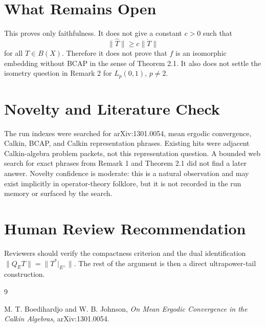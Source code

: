 \documentclass[11pt]{article}
\begin{document}
\section*{What Remains Open}

This proves only faithfulness.  It does not give a constant \(c>0\) such that
\[
  \|\widehat T\|\ge c\|\dot T\|
\]
for all \(T\in B(X)\).  Therefore it does not prove that \(f\) is an isomorphic
embedding without BCAP in the sense of Theorem 2.1.  It also does not settle
the isometry question in Remark 2 for \(L_p(0,1)\), \(p\ne2\).

\section*{Novelty and Literature Check}

The run indexes were searched for arXiv:1301.0054, mean ergodic convergence,
Calkin, BCAP, and Calkin representation phrases.  Existing hits were adjacent
Calkin-algebra problem packets, not this representation question.  A bounded
web search for exact phrases from Remark 1 and Theorem 2.1 did not find a later
answer.  Novelty confidence is moderate: this is a natural observation and may
exist implicitly in operator-theory folklore, but it is not recorded in the run
memory or surfaced by the search.

\section*{Human Review Recommendation}

Reviewers should verify the compactness criterion and the dual identification
\(\|Q_E T\|=\|T^*|_{E^\perp}\|\).  The rest of the argument is then a direct
ultrapower-tail construction.

\begin{thebibliography}{9}

M. T. Boedihardjo and W. B. Johnson,
\emph{On Mean Ergodic Convergence in the Calkin Algebras},
arXiv:1301.0054.

\end{thebibliography}
\end{document}
